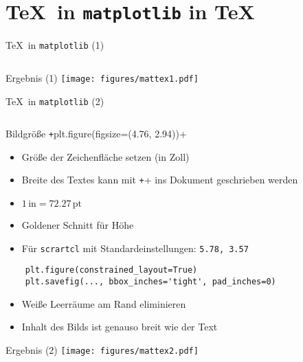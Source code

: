 \section{\TeX\ in \texttt{matplotlib} in \TeX}

\begin{frame}[fragile]{\TeX\ in \texttt{matplotlib} (1)}
  \inputminted{python}{script/mattex1.py}
\end{frame}

\AddToShipoutPictureFG*{\ShowFramePicture}
\begin{frame}{Ergebnis (1)}%
  \centering%
  \texttt{[image: figures/mattex1.pdf]}%
\end{frame}

\begin{frame}[fragile]{\TeX\ in \texttt{matplotlib} (2)}
  \inputminted{python}{script/mattex2.py}
\end{frame}

\begin{frame}[fragile]{Bildgröße}
  \texttt+plt.figure(figsize=(4.76, 2.94))+
  \begin{itemize}
    \item Größe der Zeichenfläche setzen (in Zoll)
    \item Breite des Textes kann mit \texttt+\the\textwidth+ ins Dokument geschrieben werden
    \item $1\,\mathrm{in} = \num{72.27}\,\mathrm{pt}$
    \item Goldener Schnitt für Höhe
    \item Für \texttt{scrartcl} mit Standardeinstellungen: \texttt{5.78, 3.57}
  \end{itemize}

  \begin{verbatim}
    plt.figure(constrained_layout=True)
    plt.savefig(..., bbox_inches='tight', pad_inches=0)
  \end{verbatim}
  \begin{itemize}
    \item Weiße Leerräume am Rand eliminieren
    \item Inhalt des Bilds ist genauso breit wie der Text
  \end{itemize}
\end{frame}

\AddToShipoutPictureFG*{\ShowFramePicture}
\begin{frame}{Ergebnis (2)}%
  \centering%
  \texttt{[image: figures/mattex2.pdf]}%
\end{frame}

